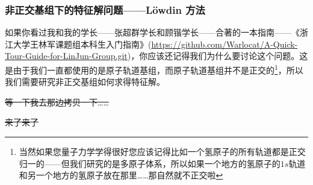 \documentclass[12pt,a4paper,openany,twoside]{article}
\numberwithin{equation}{section}
\begin{document}
                \subsubsection{非正交基组下的特征解问题——L\"owdin 方法}
                如果你看过我和我的学长——张超群学长和顾锴学长——合著的一本指南——《浙江大学王林军课题组本科生入门指南》(\url{https://github.com/Warlocat/A-Quick-Tour-Guide-for-LinJun-Group.git})，你应该还记得我们为什么要讨论这个问题。这是由于我们一直都使用的是原子轨道基组，而原子轨道基组并不是正交的\footnote{当然如果您量子力学学得很好您应该记得比如一个氢原子的所有轨道都是正交归一的——但我们研究的是多原子体系，所以如果一个地方的氢原子的$1s$轨道和另一个地方的氢原子放在那里……那自然就不正交啦}，所以我们需要研究非正交基组如何求得特征解。

                \sout{等一下我去那边拷贝一下……}

                \sout{来了来了}
\end{document}
